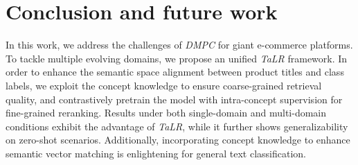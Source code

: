 \section{Conclusion and future work}
In this work, we address the challenges of \textit{DMPC} for giant e-commerce platforms. 
To tackle multiple evolving domains,
we propose an unified \textit{TaLR} framework.
In order to enhance the semantic space alignment between product titles and class labels, we exploit the concept knowledge to ensure coarse-grained retrieval quality, and contrastively pretrain the model with intra-concept supervision for fine-grained reranking. 
Results under both single-domain and multi-domain conditions exhibit the advantage of \textit{TaLR}, while it further shows generalizability on zero-shot scenarios. Additionally, incorporating concept knowledge to enhance semantic vector matching is enlightening for general text classification.

